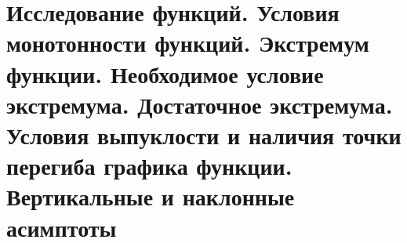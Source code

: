 \section{Исследование функций. Условия монотонности функций. Экстремум функции. Необходимое условие экстремума. Достаточное экстремума. Условия выпуклости и наличия точки перегиба графика функции. Вертикальные и наклонные асимптоты}